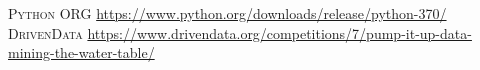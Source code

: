 	
	\begin{thebibliography}{99}
		\textsc{Python ORG}
		\newline
		\url{https://www.python.org/downloads/release/python-370/}	
		\textsc{DrivenData}
		\newline
		\url{https://www.drivendata.org/competitions/7/pump-it-up-data-mining-the-water-table/}	
	\end{thebibliography}


